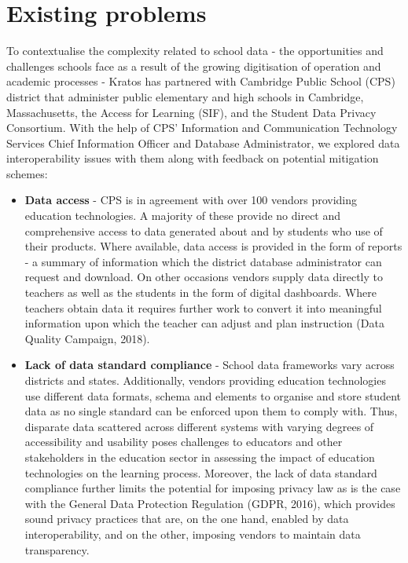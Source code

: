 \documentclass{article}
\begin{document}
\section{Existing problems}
To contextualise the complexity related to school data - the opportunities and challenges schools face as a result of the growing digitisation of operation and academic processes - Kratos has partnered with  Cambridge Public School (CPS) district that administer public elementary and high schools in Cambridge, Massachusetts, the Access for Learning (SIF), and the Student Data Privacy Consortium. With the help of CPS' Information and Communication Technology Services Chief Information Officer and Database Administrator, we explored data interoperability issues with them along with feedback on potential mitigation schemes:

\begin{itemize}
  \item \textbf{Data access} - CPS is in agreement with over 100 vendors providing education technologies. A majority of these provide no direct and comprehensive access to data generated about and by students who use of their products. Where available, data access is  provided in the form of reports - a summary of information which the district database administrator can request and download. On other occasions vendors supply data directly to teachers as well as the students in the form of digital dashboards. Where teachers obtain data it requires further work to convert it into meaningful information upon which the teacher can adjust and plan instruction (Data Quality Campaign, 2018).
  
  \item \textbf{Lack of data standard compliance} - School data frameworks vary across districts and states. Additionally, vendors providing education technologies use different data formats, schema and elements to organise and store student data as no single standard can be enforced upon them to comply with. Thus, disparate data scattered across different systems with varying degrees of accessibility and usability poses challenges to educators and other stakeholders in the education sector in assessing the impact of education technologies on the learning process. Moreover, the lack of data standard compliance further limits the potential for imposing privacy law as is the case with the General Data Protection Regulation (GDPR, 2016), which provides sound privacy practices that are, on the one hand, enabled by data interoperability, and on the other, imposing vendors to maintain data transparency.
  

\end{itemize}
\end{document}
